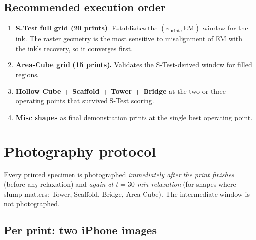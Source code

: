\documentclass[11pt,a4paper]{article}
\begin{document}
\subsection{Recommended execution order}

\begin{enumerate}[leftmargin=1.4em,itemsep=2pt]
\item \textbf{S-Test full grid (20 prints).} Establishes the
$(v_\mathrm{print}, \mathrm{EM})$ window for the ink. The raster
geometry is the most sensitive to misalignment of EM with the
ink's recovery, so it converges first.
\item \textbf{Area-Cube grid (15 prints).} Validates the
S-Test-derived window for filled regions.
\item \textbf{Hollow Cube + Scaffold + Tower + Bridge} at the
two or three operating points that survived S-Test scoring.
\item \textbf{Misc shapes} as final demonstration prints at the
single best operating point.
\end{enumerate}

\section{Photography protocol}
\label{sec:imaging}

Every printed specimen is photographed \emph{immediately after
the print finishes} (before any relaxation) and \emph{again at
$t=30$ min relaxation} (for shapes where slump matters: Tower,
Scaffold, Bridge, Area-Cube). The intermediate window is not
photographed.

\subsection{Per print: two iPhone images}
\end{document}
